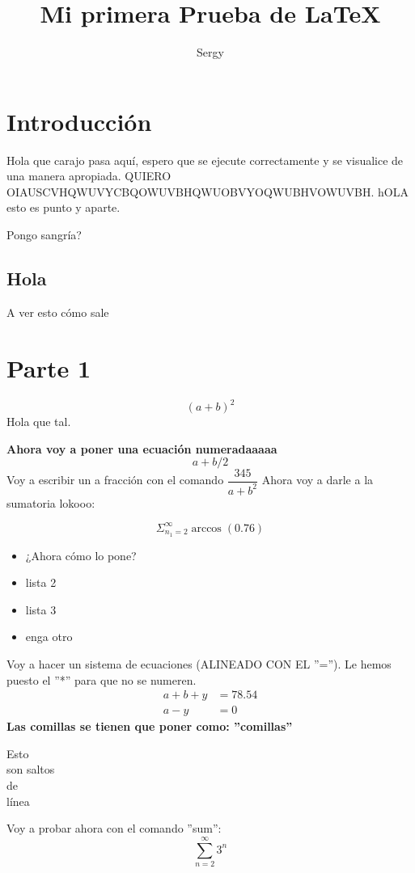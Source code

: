 \documentclass[10pt,a4paper]{article}
\author{Sergy}
\title{Mi primera Prueba de LaTeX }
\begin{document}
\maketitle
\section{Introducción}
Hola que carajo pasa aquí, espero que se ejecute correctamente y se visualice de una manera apropiada. QUIERO OIAUSCVHQWUVYCBQOWUVBHQWUOBVYOQWUBHVOWUVBH.
hOLA esto es punto y aparte.

Pongo sangría?
\subsection{Hola}
A ver esto cómo sale
\section{Parte 1}
\[(a + b)^2\]
Hola que tal.

\textbf{Ahora voy a poner una ecuación numeradaaaaa}
\begin{equation}
a + b / 2
\end{equation}
Voy a escribir un a fracción con el comando $\dfrac{345}{a + b^2}$
\bigskip
Ahora voy a darle a la sumatoria lokooo:

\[\Sigma_{n_1 = 2}^{\infty} \arccos(0.76)\]
\bigskip
\begin{itemize}
\item ¿Ahora cómo lo pone?
\item lista 2
\item lista 3
\item enga otro
\bigskip 
\end{itemize}

Voy a hacer un sistema de ecuaciones (ALINEADO CON EL ''=''). Le hemos puesto el ''*'' para que no se numeren.
\begin{align*}
a + b + y &= 78.54 \\
a - y &= 0
\end{align*}
\bigskip
\textbf{Las comillas se tienen que poner como: ''comillas''}

Esto \\ son saltos \\ de \\ línea

Voy a probar ahora con el comando ''sum'':
\begin{equation}
\sum_{n = 2}^{\infty}3^n
\end{equation}
\end{document}
